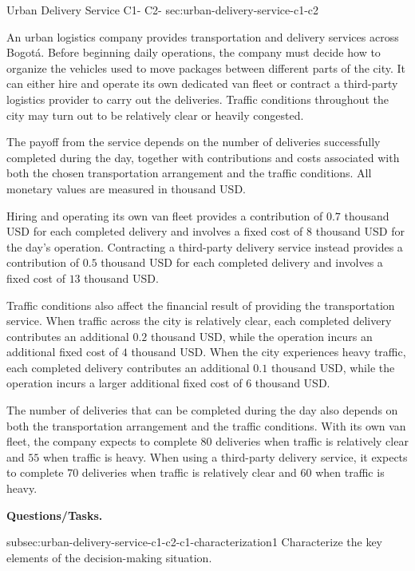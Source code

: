 	\sectionScored
	{Urban Delivery Service}
	{C1- \hspace{2mm} C2-}
	{sec:urban-delivery-service-c1-c2}
	{
	An urban logistics company provides transportation and delivery services across Bogotá. Before beginning daily operations, the company must decide how to organize the vehicles used to move packages between different parts of the city. It can either hire and operate its own dedicated van fleet or contract a third-party logistics provider to carry out the deliveries. Traffic conditions throughout the city may turn out to be relatively clear or heavily congested.

	The payoff from the service depends on the number of deliveries successfully completed during the day, together with contributions and costs associated with both the chosen transportation arrangement and the traffic conditions. All monetary values are measured in thousand USD.

	Hiring and operating its own van fleet provides a contribution of \(0.7\) thousand USD for each completed delivery and involves a fixed cost of \(8\) thousand USD for the day's operation. Contracting a third-party delivery service instead provides a contribution of \(0.5\) thousand USD for each completed delivery and involves a fixed cost of \(13\) thousand USD.

	Traffic conditions also affect the financial result of providing the transportation service. When traffic across the city is relatively clear, each completed delivery contributes an additional \(0.2\) thousand USD, while the operation incurs an additional fixed cost of \(4\) thousand USD. When the city experiences heavy traffic, each completed delivery contributes an additional \(0.1\) thousand USD, while the operation incurs a larger additional fixed cost of \(6\) thousand USD.

	The number of deliveries that can be completed during the day also depends on both the transportation arrangement and the traffic conditions. With its own van fleet, the company expects to complete \(80\) deliveries when traffic is relatively clear and \(55\) when traffic is heavy. When using a third-party delivery service, it expects to complete \(70\) deliveries when traffic is relatively clear and \(60\) when traffic is heavy.

	\textbf{Questions/Tasks.}
	\begin{enumerate}
		\CriterionTask
		{subsec:urban-delivery-service-c1-c2-c1-characterization}{1}
		{Characterize the key elements of the decision-making situation. }


\end{enumerate}}
